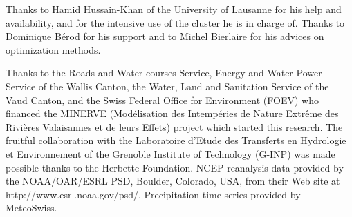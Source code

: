 \documentclass{ametsoc}
\begin{document}
%
\acknowledgments
Thanks to Hamid Hussain-Khan of the University of Lausanne for his help and availability, and for the intensive use of the cluster he is in charge of. Thanks to Dominique B\'{e}rod for his support and to Michel Bierlaire for his advices on optimization methods.

Thanks to the Roads and Water courses Service, Energy and Water Power Service of the Wallis Canton, the Water, Land and Sanitation Service of the Vaud Canton, and the Swiss Federal Office for Environment (FOEV) who financed the MINERVE (Mod\'{e}lisation des Intemp\'{e}ries de Nature Extr\^{e}me des Rivi\`{e}res Valaisannes et de leurs Effets) project which started this research. The fruitful collaboration with the Laboratoire d'Etude des Transferts en Hydrologie et Environnement of the Grenoble Institute of Technology (G-INP) was made possible thanks to the Herbette Foundation. NCEP reanalysis data provided by the NOAA/OAR/ESRL PSD, Boulder, Colorado, USA, from their Web site at http://www.esrl.noaa.gov/psd/. Precipitation time series provided by MeteoSwiss. 


%




\end{document}
